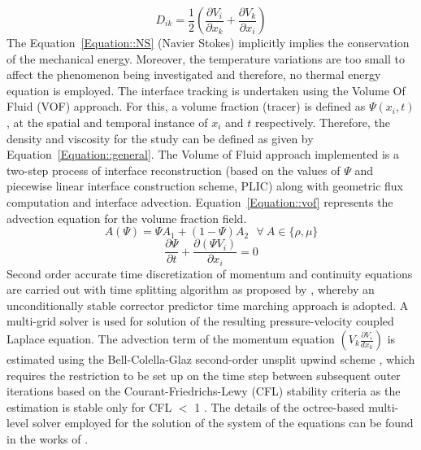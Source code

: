 \documentclass[%
aip,
sd,%
amsmath,amssymb,
preprint,%
author-year,%
]{revtex4-1}
\begin{document}
\begin{equation} \label{Equation::deformation}
D_{ik} = \frac{1}{2}\left(\frac{\partial V_i}{\partial x_k} + \frac{\partial V_k}{\partial x_i}\right)
\end{equation}
The Equation~\ref{Equation::NS} (Navier Stokes) implicitly implies the conservation of the mechanical energy. Moreover, the temperature variations are too small to affect the phenomenon being investigated and therefore, no thermal energy equation is employed. The interface tracking is undertaken using the Volume Of Fluid (VOF) approach. For this, a volume fraction (tracer) is defined as $\Psi(x_i,t)$, at the spatial and temporal instance of $x_i$ and $t$ respectively. Therefore, the density and viscosity for the study can be defined as given by Equation~\ref{Equation::general}. The Volume of Fluid approach implemented is a two-step process of interface reconstruction (based on the values of $\Psi$ and piecewise linear interface construction scheme, PLIC) along with geometric flux computation and interface advection. Equation~\ref{Equation::vof} represents the advection equation for the volume fraction field.
\begin{equation} \label{Equation::general}
A (\Psi) = \Psi A_1 + (1-\Psi)A_2 \: \: \:  \forall  \: A \in \{\rho, \mu\}
\end{equation}
\begin{equation} \label{Equation::vof}
\frac{\partial \Psi}{\partial t} + \frac{\partial(\Psi V_i)}{\partial x_i} = 0
\end{equation}
Second order accurate time discretization of momentum and continuity equations are carried out with time splitting algorithm as proposed by \cite{Chorin1968}, whereby an unconditionally stable corrector predictor time marching approach is adopted. A multi-grid solver is used for solution of the resulting pressure-velocity coupled Laplace equation. The advection term of the momentum equation $\left(V_k\frac{\partial V_i}{dx_k}\right)$ is estimated using the Bell-Colella-Glaz second-order unsplit upwind scheme \citep{bell1989second}, which requires the restriction to be set up on the time step between subsequent outer iterations based on the Courant-Friedrichs-Lewy (CFL) stability criteria as the estimation is stable only for CFL $<$ 1 \citep{popinet2009}. The details of the octree-based multi-level solver employed for the solution of the system of the equations can be found in the works of \cite{Popinet2003,popinet2009}. \\ 
\end{document}
